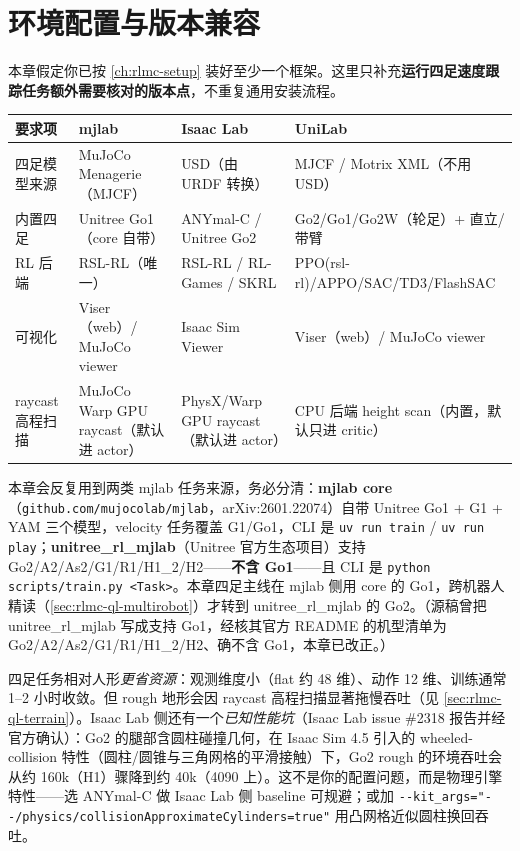 \section{环境配置与版本兼容}
\label{sec:rlmc-ql-setup}

本章假定你已按 \cref{ch:rlmc-setup} 装好至少一个框架。这里只补充\textbf{运行四足速度跟踪任务额外需要核对的版本点}，不重复通用安装流程。

\begin{center}
\small
\begin{tabular}{@{}llll@{}}
\toprule
要求项 & mjlab & Isaac Lab & UniLab \\
\midrule
四足模型来源 & MuJoCo Menagerie（MJCF） & USD（由 URDF 转换） & MJCF / Motrix XML（不用 USD） \\
内置四足 & Unitree Go1（core 自带） & ANYmal-C / Unitree Go2 & Go2/Go1/Go2W（轮足）+ 直立/带臂 \\
RL 后端 & RSL-RL（唯一） & RSL-RL / RL-Games / SKRL & PPO(rsl-rl)/APPO/SAC/TD3/FlashSAC \\
可视化 & Viser（web）/ MuJoCo viewer & Isaac Sim Viewer & Viser（web）/ MuJoCo viewer \\
raycast 高程扫描 & MuJoCo Warp GPU raycast（默认进 actor） & PhysX/Warp GPU raycast（默认进 actor） & CPU 后端 height scan（内置，默认只进 critic） \\
\bottomrule
\end{tabular}
\end{center}

\begin{note}
本章会反复用到两类 mjlab 任务来源，务必分清：\textbf{mjlab core}（\verb|github.com/mujocolab/mjlab|，arXiv:2601.22074）自带 Unitree Go1 + G1 + YAM 三个模型，velocity 任务覆盖 G1/Go1，CLI 是 \verb|uv run train| / \verb|uv run play|；\textbf{unitree\_rl\_mjlab}（Unitree 官方生态项目）支持 Go2/A2/As2/G1/R1/H1\_2/H2——\textbf{不含 Go1}——且 CLI 是 \verb|python scripts/train.py <Task>|。本章四足主线在 mjlab 侧用 core 的 Go1，跨机器人精读（\cref{sec:rlmc-ql-multirobot}）才转到 unitree\_rl\_mjlab 的 Go2。（源稿曾把 unitree\_rl\_mjlab 写成支持 Go1，经核其官方 README 的机型清单为 Go2/A2/As2/G1/R1/H1\_2/H2、确不含 Go1，本章已改正。）
\end{note}

四足任务相对人形\emph{更省资源}：观测维度小（flat 约 48 维）、动作 12 维、训练通常 1--2 小时收敛。但 rough 地形会因 raycast 高程扫描显著拖慢吞吐（见 \cref{sec:rlmc-ql-terrain}）。Isaac Lab 侧还有一个\emph{已知性能坑}（Isaac Lab issue \#2318 报告并经官方确认）：Go2 的腿部含圆柱碰撞几何，在 Isaac Sim 4.5 引入的 wheeled-collision 特性（圆柱/圆锥与三角网格的平滑接触）下，Go2 rough 的环境吞吐会从约 160k（H1）骤降到约 40k（4090 上）。这不是你的配置问题，而是物理引擎特性——选 ANYmal-C 做 Isaac Lab 侧 baseline 可规避；或加 \verb|--kit_args="--/physics/collisionApproximateCylinders=true"| 用凸网格近似圆柱换回吞吐。

